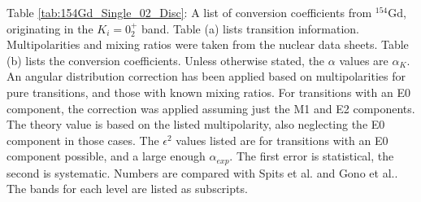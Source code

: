 \begin{table}
\begin{ThreePartTable}
        \begin{tablenotes}
            Table \ref{tab:154Gd_Single_02_Disc}: A list of conversion coefficients from $^{154}$Gd, originating in the $K_i=0^+_2$ band. Table (a) lists transition information. Multipolarities and mixing ratios were taken from the nuclear data sheets\citep{reich09:_nds_154}. Table (b) lists the conversion coefficients. Unless otherwise stated, the $\alpha$ values are $\alpha_K$. An angular distribution correction has been applied based on multipolarities for pure transitions, and those with known mixing ratios. For transitions with an E0 component, the correction was applied assuming just the M1 and E2 components. The theory value is based on the listed multipolarity, also neglecting the E0 component in those cases. The $\epsilon^2$ values listed are for transitions with an E0 component possible, and a large enough $\alpha_{exp}$. The first error is statistical, the second is systematic. Numbers are compared with Spits et al.\citep{spits96:_154gd} and Gono et al.\citep{gono74:_154gd_e0}. The bands for each level are listed as subscripts.
        \end{tablenotes}
\end{ThreePartTable}
\end{table}

